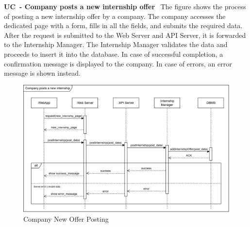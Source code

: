\textbf{UC\cuc\ - Company posts a new internship offer} \ The figure shows the process of posting a new internship offer by a company. The company accesses the dedicated page with a form, fills in all the fields, and submits the required data. After the request is submitted to the Web Server and API Server, it is forwarded to the Internship Manager. The Internship Manager validates the data and proceeds to insert it into the database. In case of successful completion, a confirmation message is displayed to the company. In case of errors, an error message is shown instead.
\begin{center}
    \begin{figure}[H]
        \centering
        \includegraphics[width=1\linewidth]{Images/Sequence diagrams/UC12.png}
        \caption{Company New Offer Posting}
        \label{fig:enter-label}
    \end{figure}
\end{center}

